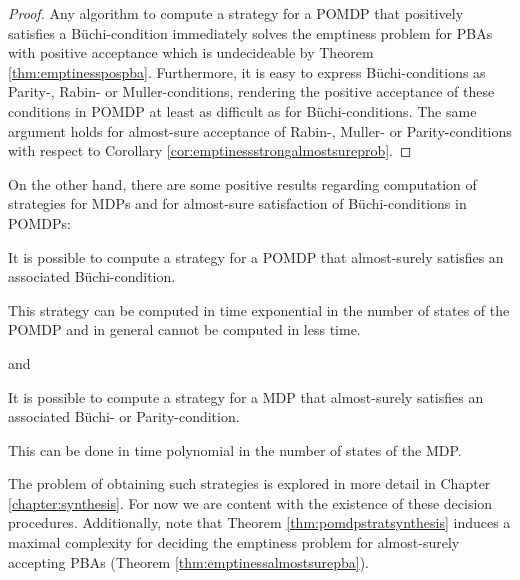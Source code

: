 \begin{proof}
  Any algorithm to compute a strategy for a \ac{POMDP} that positively 
  satisfies a Büchi-condition immediately solves the emptiness problem for
  \acp{PBA} with positive acceptance which is undecideable by Theorem 
  \ref{thm:emptinesspospba}. Furthermore, it is easy to express 
  Büchi-conditions as Parity-, Rabin- or Muller-conditions, rendering the 
  positive acceptance of these conditions in \ac{POMDP} at least as difficult
  as for Büchi-conditions. The same argument holds for almost-sure acceptance
  of Rabin-, Muller- or Parity-conditions with respect to Corollary 
  \ref{cor:emptinessstrongalmostsureprob}.
\end{proof}

On the other hand, there are some positive results regarding computation of 
strategies for \acp{MDP} and for almost-sure satisfaction of Büchi-conditions
in \acp{POMDP}:
\begin{theorem}
  \cite[Theorem 5]{QualAnaPOMDP}
  It is possible to compute a strategy for a \ac{POMDP} that almost-surely
  satisfies an associated Büchi-condition. 

  This strategy can be computed in
  time exponential in the number of states of the \ac{POMDP} and in general
  cannot be computed in less time.
  \label{thm:pomdpstratsynthesis}
\end{theorem}
and
\begin{theorem}
  \cite[Theorem 4.1.7.]{QuanStochParityGames}
  It is possible to compute a strategy for a \ac{MDP} that almost-surely
  satisfies an associated Büchi- or Parity-condition.

  This can be done in time polynomial in the number of states of the \ac{MDP}.
  \label{thm:mdpstratsynthesis}
\end{theorem}
The problem of obtaining such strategies is explored in more detail in Chapter
\ref{chapter:synthesis}. For now we are content with the existence of these 
decision procedures. Additionally, note that Theorem 
\ref{thm:pomdpstratsynthesis} induces a maximal complexity for deciding the 
emptiness problem for almost-surely accepting \acp{PBA} (Theorem 
\ref{thm:emptinessalmostsurepba}).

